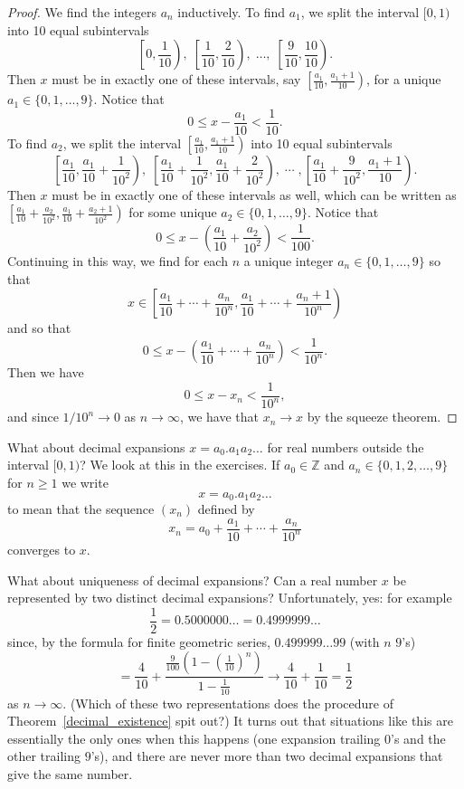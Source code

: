 \documentclass[11pt,dvipsnames]{book}
\numberwithin{equation}{section} %
\numberwithin{figure}{section} %
\numberwithin{table}{section} %
\begin{document}
\begin{proof}
We find the integers $a_{n}$ inductively. To find $a_1$, we split the interval $[0,1)$ into 10 equal subintervals
\[ \left[0,\frac{1}{10}\right),  \; \left[\frac{1}{10}, \frac{2}{10}\right), \; \dots , \; \left[\frac{9}{10},\frac{10}{10}\right).\]
Then $x$ must be in exactly one of these intervals, say $\left[\frac{a_1}{10}, \frac{a_1 +1}{10}\right)$, for a unique $a_1 \in \{0, 1, \dots , 9\}$.
Notice that 
\[ 0 \leq x - \frac{a_1}{10} < \frac{1}{10}.\]
To find $a_2$, we split the interval $\left[\frac{a_1}{10}, \frac{a_1 +1}{10}\right)$ into 10 equal subintervals 
\[
\left[\frac{a_{1}}{10},\frac{a_{1}}{10}+\frac{1}{10^2}\right),\;
\left[\frac{a_{1}}{10}+\frac{1}{10^2},\frac{a_{1}}{10}+\frac{2}{10^2}\right), \; \cdots \;
,\left[\frac{a_{1}}{10}+\frac{9}{10^2},\frac{a_{1}+1}{10}\right).
\]
Then $x$ must be in exactly one of these intervals as well, which can be written as $\left[\frac{a_{1}}{10}+\frac{a_{2}}{10^2},\frac{a_{1}}{10}+\frac{a_2+1}{10^2}\right)$ for some unique $a_{2}\in \{0,1, \dots ,9\}$. Notice that
\[ 0 \leq x - \left(\frac{a_1}{10} + \frac{a_2}{10^2}\right) < \frac{1}{100}.\]
\noindent
Continuing in this way, we find for each $n$ a unique integer $a_{n}\in \{0,1,\dots,9\}$ so that 
\begin{equation*}
\label{e:xininterval}
x\in \left[\frac{a_{1}}{10}+\cdots +\frac{a_{n}}{10^{n}}, \frac{a_{1}}{10}+\cdots  +\frac{a_{n}+1}{10^{n}}\right)
\end{equation*}
and so that
\[ 0 \leq x- \left( \frac{a_{1}}{10}+\cdots +\frac{a_{n}}{10^{n}} \right) < \frac{1}{10^n}.\]
Then we have
\[ 0 \leq x - x_n < \frac{1}{10^n},\]
and since $1/10^{n} \to 0$ as $n \to \infty$, we have that $x_n \to x$ by the squeeze theorem.
\end{proof}

\medskip
What about decimal expansions $x = a_0.a_1 a_2 \dots$ for real numbers outside the interval $[0,1)$? We look at this in the exercises. If $a_0 \in \mathbb{Z}$ and $a_n \in \{0,1,2, \dots , 9\}$ for $n\geq 1$ we write
\[ x = a_0.a_1 a_2 \dots\]
to mean that the sequence $(x_n)$ defined by
\[x_n = a_0 + \frac{a_{1}}{10}+\cdots +\frac{a_{n}}{10^{n}}\] 
converges to $x$.

What about uniqueness of decimal expansions? Can a real number $x$ be represented by two distinct decimal expansions? Unfortunately, yes: for example
\[ \frac{1}{2} = 0.5000000\ldots = 0.4999999\dots \]
since, by the formula for finite geometric series, $0.499999 \dots 99$ (with $n$ $9$'s) 
\[= \frac{4}{10} + \frac
{\frac{9}{100}(1- (\frac{1}{10})^{n})}
{1- \frac{1}{10}} \rightarrow \frac{4}{10} + \frac{1}{10} = \frac{1}{2}\]
as $n \to \infty$. (Which of these two representations does the procedure of Theorem~\ref{decimal_existence} spit out?)
It turns out that situations like this are essentially the only ones when this happens (one expansion trailing $0$'s and the other trailing $9$'s), and there are never more than two decimal expansions that give the same number. 
\end{document}
